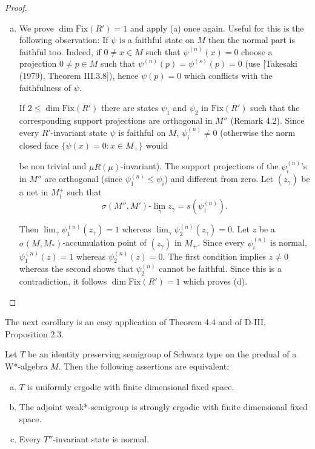 \begin{proof}
\begin{enumerate}[(a)]
\item
We prove \(\dim \text{Fix}(R') = 1\) and apply (a) once again.
Useful for this is the following observation: If \(\psi\) is a faithful state on \(M\) then the normal part is faithful too.
Indeed, if \(0 \neq x \in M\) such that \(\psi^{(n)}(x) = 0\) choose a projection \(0 \neq p \in M\) such that \(\psi^{(n)}(p) = \psi^{(s)}(p) = 0\) (use [Takesaki (1979), Theorem III.3.8]), hence \(\psi(p) = 0\) which conflicts with the faithfulness of \(\psi\).

If \(2 \leq \dim \text{Fix}(R')\) there are states \(\psi_{1}\) and \(\psi_{2}\) in \(\text{Fix}(R')\) such that the corresponding support projections are orthogonal in \(M''\) (Remark 4.2).
Since every \(R'\)-invariant state \(\psi\) is faithful on \(M\), \(\psi_{i}^{(n)} \neq 0\) (otherwise the norm closed face \(\{\psi(x) = 0: x \in M_{+}\}\) would

\newpage

be non trivial and \(\mu R(\mu)\)-invariant).
The support projections of the \(\psi_{i}^{(n)}\)'s in \(M''\) are orthogonal (since \(\psi_{1}^{(n)} \leq \psi_{i}\)) and different from zero.
Let \((z_{\gamma})\) be a net in \(M_{1}^{+}\) such that
\[
\sigma(M'',M')\text{-}\lim_{\gamma} z_{\gamma} = s(\psi_{1}^{(n)}).
\]

Then \(\lim_{\gamma} \psi_{1}^{(n)}(z_{\gamma}) = 1\) whereas \(\lim_{\gamma} \psi_{2}^{(n)}(z_{\gamma}) = 0\).
Let \(z\) be a \(\sigma(M,M_{*})\)-accumulation point of \((z_{\gamma})\) in \(M_{+}\).
Since every \(\psi_{i}^{(n)}\) is normal, \(\psi_{1}^{(n)}(z) = 1\) whereas \(\psi_{2}^{(n)}(z) = 0\).
The first condition implies \(z \neq 0\) whereas the second shows that \(\psi_{2}^{(n)}\) cannot be faithful.
Since this is a contradiction, it follows \(\dim \text{Fix}(R') = 1\) which proves (d).
\end{enumerate}
\end{proof}

The next corollary is an easy application of Theorem 4.4 and of D-III, Proposition 2.3.

\begin{corollary}\label{cor:d4-4-5}
Let \(T\) be an identity preserving semigroup of Schwarz type on the predual of a W*-algebra \(M\).
Then the following assertions are equivalent:

\begin{enumerate}[(a)]
\item
\(T\) is uniformly ergodic with finite dimensional fixed space.

\item
The adjoint weak*-semigroup is strongly ergodic with finite dimensional fixed space.

\item
Every \(T''\)-invariant state is normal.
\end{enumerate}
\end{corollary}

